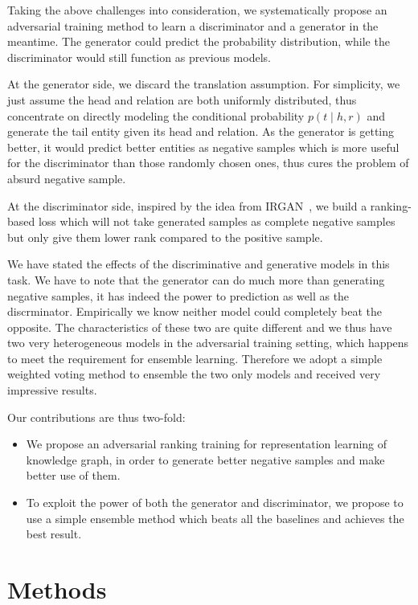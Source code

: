 \documentclass[twocolumn,a4paper,10pt,review,5p]{elsarticle}
\begin{document}
Taking the above challenges into consideration, we systematically propose an adversarial training method to learn a discriminator and a generator in the meantime. The generator could predict the probability distribution, while the discriminator would still function as previous models.

At the generator side, we discard the translation assumption. For simplicity, we just assume the head and relation are both uniformly distributed, thus concentrate on directly modeling the conditional probability $p(t\mid h, r)$ and generate the tail entity given its head and relation. As the generator is getting better, it would predict better entities as negative samples which is more useful for the discriminator than those randomly chosen ones, thus cures the problem of absurd negative sample.

At the discriminator side, inspired by the idea from IRGAN~\cite{IRGAN}, we build a ranking-based loss which will not take generated samples as complete negative samples but only give them lower rank compared to the positive sample.

We have stated the effects of the discriminative and generative models in this task. We have to note that the generator can do much more than generating negative samples, it has indeed the power to prediction as well as the discrminator. Empirically we know neither model could completely beat the opposite. The characteristics of these two are quite different and we thus have two very heterogeneous models in the adversarial training setting, which happens to meet the requirement for ensemble learning. Therefore we adopt a simple weighted voting method to ensemble the two only models and received very impressive results.

Our contributions are thus two-fold:
\begin{itemize}
    \item We propose an adversarial ranking training for representation learning of knowledge graph, in order to generate better negative samples and make better use of them.
    \item To exploit the power of both the generator and discriminator, we propose to use a simple ensemble method which beats all the baselines and achieves the best result.
\end{itemize}



\section{Methods}
\end{document}
